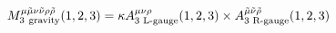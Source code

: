 \begin{equation}\begin{split}\label{eq22}
{M}_{\rm 3 \ gravity}^{\mu\tilde\mu\nu\tilde\nu\rho\tilde\rho}&(1,2,3) = \kappa{A}^{\mu\nu\rho}_\text{3 L-gauge}(1,2,3)\times {A}^{\tilde\mu\tilde\nu\tilde\rho}_\text{3 R-gauge}(1,2,3)
\end{split}\end{equation}

